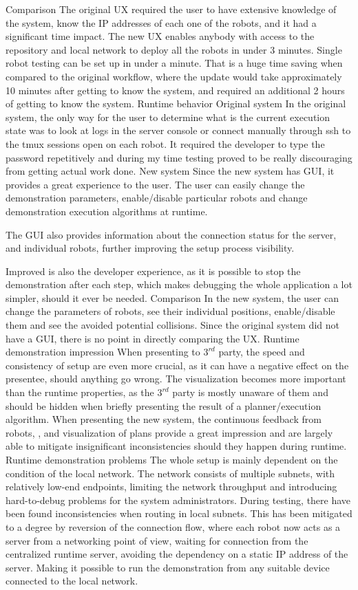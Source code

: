 \secc Comparison
The original UX required the user to have extensive knowledge of the system, know the IP addresses of each one of the robots, and it had a significant time impact. The new UX enables anybody with access to the repository and local network to deploy all the robots in under 3 minutes. Single robot testing can be set up in under a minute. That is a huge time saving when compared to the original workflow, where the update would take approximately 10 minutes after getting to know the system, and required an additional 2 hours of getting to know the system.
\sec Runtime behavior
\secc Original system
In the original system, the only way for the user to determine what is the current execution state was to look at logs in the server console or connect manually through ssh to the tmux sessions open on each robot. It required the developer to type the password repetitively and during my time testing proved to be really discouraging from getting actual work done.
\secc New system
Since the new system has GUI, it provides a great experience to the user. The user can easily change the demonstration parameters, enable/disable particular robots and change demonstration execution algorithms at runtime.

The GUI also provides information about the connection status for the server, and individual robots, further improving the setup process visibility.

Improved is also the developer experience, as it is possible to stop the demonstration after each step, which makes debugging the whole application a lot simpler, should it ever be needed.
\secc Comparison
In the new system, the user can change the parameters of robots, see their individual positions, enable/disable them and see the avoided potential collisions. Since the original system did not have a GUI, there is no point in directly comparing the UX. 
\sec Runtime demonstration impression
When presenting to $3^{rd}$ party, the speed and consistency of setup are even more crucial, as it can have a negative effect on the presentee, should anything go wrong. The visualization becomes more important than the runtime properties, as the $3^{rd}$ party is mostly unaware of them and should be hidden when briefly presenting the result of a planner/execution algorithm. When presenting the new system, the continuous feedback from robots, {\vicon}, and visualization of plans provide a great impression and are largely able to mitigate insignificant inconsistencies should they happen during runtime.
\sec Runtime demonstration problems
The whole setup is mainly dependent on the condition of the local network. The network consists of multiple subnets, with relatively low-end endpoints, limiting the network throughput and introducing hard-to-debug problems for the system administrators. During testing, there have been found inconsistencies when routing in local subnets. This has been mitigated to a degree by reversion of the connection flow, where each robot now acts as a server from a networking point of view, waiting for connection from the centralized runtime server, avoiding the dependency on a static IP address of the server. Making it possible to run the demonstration from any suitable device connected to the local network.